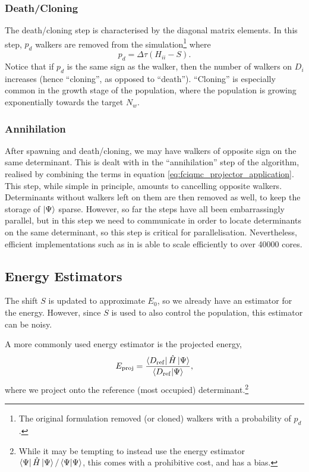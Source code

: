 \subsubsection{Death/Cloning}

The death/cloning step is characterised by the diagonal matrix elements. In this step, $p_d$ walkers are removed from the simulation\footnote{The original formulation removed (or cloned) walkers with a probability of $p_d$.} where
\begin{equation}
    p_d = \Delta\tau(H_{ii}-S).
\end{equation}
Notice that if $p_d$ is the same sign as the walker, then the number of walkers on $D_i$ increases (hence ``cloning'', as opposed to ``death''). ``Cloning'' is especially common in the growth stage of the population, where the population is growing exponentially towards the target $N_w$.

\subsubsection{Annihilation}

After spawning and death/cloning, we may have walkers of opposite sign on the same determinant. This is dealt with in the ``annihilation'' step of the algorithm, realised by combining the terms in equation \ref{eq:fciqmc_projector_application}. This step, while simple in principle, amounts to cancelling opposite walkers. Determinants without walkers left on them are then removed as well, to keep the storage of $\ket\Psi$ sparse. However, so far the steps have all been embarrassingly parallel, but in this step we need to communicate in order to locate determinants on the same determinant, so this step is critical for parallelisation. Nevertheless, efficient implementations such as in \neci is able to scale efficiently to over 40000 cores.\supercite{Booth2014}

\subsection{Energy Estimators}
\label{sec:fciqmc_energy_estimators}

The shift $S$ is updated to approximate $E_0$, so we already have an estimator for the energy. However, since $S$ is used to also control the population, this estimator can be noisy.\supercite{boothFermion2009}

A more commonly used energy estimator is the projected energy,
\begin{equation}
    \label{eq:projected_energy}
    E_\mathrm{proj} = \frac{\bra{D_\mathrm{ref}}\hat H\ket{\Psi}}{\braket{D_\mathrm{ref}}{\Psi}},
\end{equation}
where we project onto the reference (most occupied) determinant.\footnote{While it may be tempting to instead use the energy estimator $\bra{\Psi}\hat H\ket{\Psi}/\braket{\Psi}{\Psi}$, this comes with a prohibitive cost, and has a bias.\supercite{bluntDensitymatrix2014,boothFermion2009}
}

